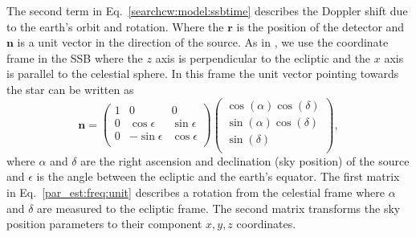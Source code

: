 The second term in Eq.~\ref{searchcw:model:ssbtime} describes the Doppler shift due to the earth's orbit and rotation.
Where the $\bm{r}$ is the position of the detector and $\bm{n}$ is a unit vector in the direction of the source. 
As in \citep{schutz1998DataAnalysis}, we use the coordinate frame in the \gls{SSB} where the $z$ axis is perpendicular to the ecliptic and the $x$ axis is parallel to the celestial sphere.
In this frame the unit vector pointing towards the star can be written as 
\begin{equation}
    \label{par_est:freq:unit}
    \bm{n} = 
    \left(
    \begin{matrix}
        1 & 0 & 0  \\
        0 & \cos \epsilon & \sin \epsilon \\
        0 & -\sin \epsilon & \cos \epsilon \\
    \end{matrix} \right)
    \left(
    \begin{matrix}
        \cos(\alpha)\cos(\delta)  \\
        \sin(\alpha)\cos(\delta) \\
        \sin(\delta) \\
    \end{matrix} \right),
\end{equation}
where $\alpha$ and $\delta$ are the right ascension and declination (sky position) of the source and $\epsilon$ is the angle between the ecliptic and the earth's equator.
The first matrix in Eq.~\ref{par_est:freq:unit} describes a rotation from the celestial frame where $\alpha$ and $\delta$ are measured to the ecliptic frame. 
The second matrix transforms the sky position parameters to their component $x,y,z$ coordinates.

